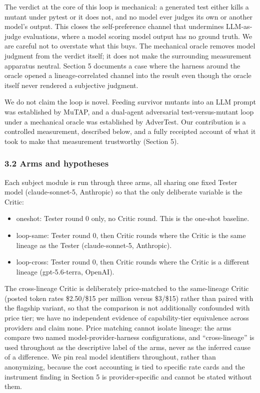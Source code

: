 \documentclass[
  11pt,
]{article}
\newcounter{none} %
\providecommand{\tightlist}{%
  \setlength{\itemsep}{0pt}\setlength{\parskip}{0pt}}
\begin{document}
The verdict at the core of this loop is mechanical: a generated test
either kills a mutant under pytest or it does not, and no model ever
judges its own or another model's output. This closes the
self-preference channel that undermines LLM-as-judge evaluations, where
a model scoring model output has no ground truth. We are careful not to
overstate what this buys. The mechanical oracle removes model judgment
from the verdict itself; it does not make the surrounding measurement
apparatus neutral. Section 5 documents a case where the harness around
the oracle opened a lineage-correlated channel into the result even
though the oracle itself never rendered a subjective judgment.

We do not claim the loop is novel. Feeding survivor mutants into an LLM
prompt was established by MuTAP, and a dual-agent adversarial
test-versus-mutant loop under a mechanical oracle was established by
AdverTest. Our contribution is a controlled measurement, described
below, and a fully receipted account of what it took to make that
measurement trustworthy (Section 5).

\subsubsection{3.2 Arms and hypotheses}\label{arms-and-hypotheses}

Each subject module is run through three arms, all sharing one fixed
Tester model (claude-sonnet-5, Anthropic) so that the only deliberate
variable is the Critic:

\begin{itemize}
\tightlist
\item
  oneshot: Tester round 0 only, no Critic round. This is the one-shot
  baseline.
\item
  loop-same: Tester round 0, then Critic rounds where the Critic is the
  same lineage as the Tester (claude-sonnet-5, Anthropic).
\item
  loop-cross: Tester round 0, then Critic rounds where the Critic is a
  different lineage (gpt-5.6-terra, OpenAI).
\end{itemize}

The cross-lineage Critic is deliberately price-matched to the
same-lineage Critic (posted token rates \$2.50/\$15 per million versus
\$3/\$15) rather than paired with the flagship variant, so that the
comparison is not additionally confounded with price tier; we have no
independent evidence of capability-tier equivalence across providers and
claim none. Price matching cannot isolate lineage: the arms compare two
named model-provider-harness configurations, and ``cross-lineage'' is
used throughout as the descriptive label of the arms, never as the
inferred cause of a difference. We pin real model identifiers
throughout, rather than anonymizing, because the cost accounting is tied
to specific rate cards and the instrument finding in Section 5 is
provider-specific and cannot be stated without them.
\end{document}
